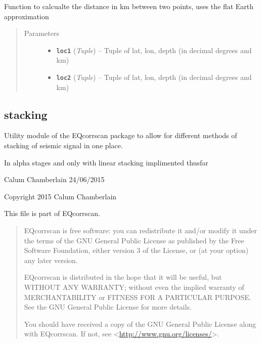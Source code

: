 \documentclass[a4paper,10pt,english]{sphinxmanual}
\begin{document}
\begin{fulllineitems}
\label{utils:mag_calc.dist_calc}
Function to calcualte the distance in km between two points, uses the flat
Earth approximation
\begin{quote}\begin{description}
\item[{Parameters}] \leavevmode\begin{itemize}
\item {} 
\textbf{\texttt{loc1}} (\emph{Tuple}) -- Tuple of lat, lon, depth (in decimal degrees and km)

\item {} 
\textbf{\texttt{loc2}} (\emph{Tuple}) -- Tuple of lat, lon, depth (in decimal degrees and km)

\end{itemize}

\end{description}\end{quote}

\end{fulllineitems}



\subsection{stacking}
\label{utils:stacking}\label{utils:module-stacking}
Utility module of the EQcorrscan package to allow for different methods of
stacking of seismic signal in one place.

In alpha stages and only with linear stacking implimented thusfar

Calum Chamberlain 24/06/2015

Copyright 2015 Calum Chamberlain

This file is part of EQcorrscan.
\begin{quote}

EQcorrscan is free software: you can redistribute it and/or modify
it under the terms of the GNU General Public License as published by
the Free Software Foundation, either version 3 of the License, or
(at your option) any later version.

EQcorrscan is distributed in the hope that it will be useful,
but WITHOUT ANY WARRANTY; without even the implied warranty of
MERCHANTABILITY or FITNESS FOR A PARTICULAR PURPOSE.  See the
GNU General Public License for more details.

You should have received a copy of the GNU General Public License
along with EQcorrscan.  If not, see \textless{}\href{http://www.gnu.org/licenses/}{http://www.gnu.org/licenses/}\textgreater{}.
\end{quote}
\end{document}
